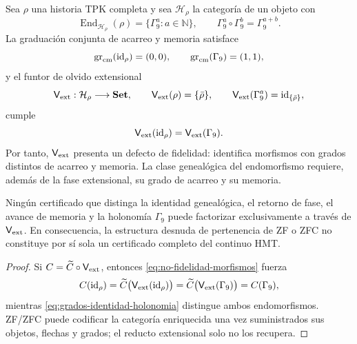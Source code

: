 Sea \(\rho\) una historia TPK completa y sea
\(\mathcal H_\rho\) la categoría de un objeto con
\begin{equation}
 \operatorname{End}_{\mathcal H_\rho}(\rho)
 =\{\Gamma_9^a:a\in\mathbb N\},
 \qquad
 \Gamma_9^a\circ\Gamma_9^b=\Gamma_9^{a+b}.
 \label{eq:monoide-holonomia-cardinal}
\end{equation}
La graduaci\'on conjunta de acarreo y memoria satisface
\begin{equation}
 \operatorname{gr}_{\rm cm}(\operatorname{id}_\rho)=(0,0),
 \qquad
 \operatorname{gr}_{\rm cm}(\Gamma_9)=(1,1),
 \label{eq:grados-identidad-holonomia}
\end{equation}
y el funtor de olvido extensional
\begin{equation}
 \mathsf V_{\rm ext}:\mathcal H_\rho\longrightarrow\mathbf{Set},
 \qquad
 \mathsf V_{\rm ext}(\rho)=\{\bar\rho\},
 \qquad
 \mathsf V_{\rm ext}(\Gamma_9^a)
 =\operatorname{id}_{\{\bar\rho\}},
 \label{eq:funtor-olvido-arquimediano}
\end{equation}
cumple
\begin{equation}
 \mathsf V_{\rm ext}(\operatorname{id}_\rho)
 =\mathsf V_{\rm ext}(\Gamma_9).
 \label{eq:no-fidelidad-morfismos}
\end{equation}
Por tanto, \(\mathsf V_{\rm ext}\) presenta un defecto de fidelidad: identifica
morfismos con grados distintos de acarreo y memoria. La clase geneal\'ogica
del endomorfismo requiere, además de la fase extensional, su grado de acarreo
y su memoria.

\begin{corollary}
\label{cor:insuficiencia-certificadora-extensional-autonomo}
Ningún certificado que distinga la identidad genealógica, el retorno de
fase, el avance de memoria y la holonomía \(\Gamma_9\) puede factorizar
exclusivamente a través de \(\mathsf V_{\rm ext}\). En consecuencia, la
estructura desnuda de pertenencia de ZF o ZFC no constituye por sí sola un
certificado completo del continuo HMT.
\end{corollary}

\begin{proof}
Si \(C=\widetilde C\circ\mathsf V_{\rm ext}\), entonces
\eqref{eq:no-fidelidad-morfismos} fuerza
\[
 C(\operatorname{id}_\rho)
 =\widetilde C\bigl(\mathsf V_{\rm ext}(\operatorname{id}_\rho)\bigr)
 =\widetilde C\bigl(\mathsf V_{\rm ext}(\Gamma_9)\bigr)
 =C(\Gamma_9),
\]
mientras \eqref{eq:grados-identidad-holonomia} distingue ambos
endomorfismos. ZF/ZFC puede codificar la categoría enriquecida una vez
suministrados sus objetos, flechas y grados; el reducto extensional solo no
los recupera.
\end{proof}

